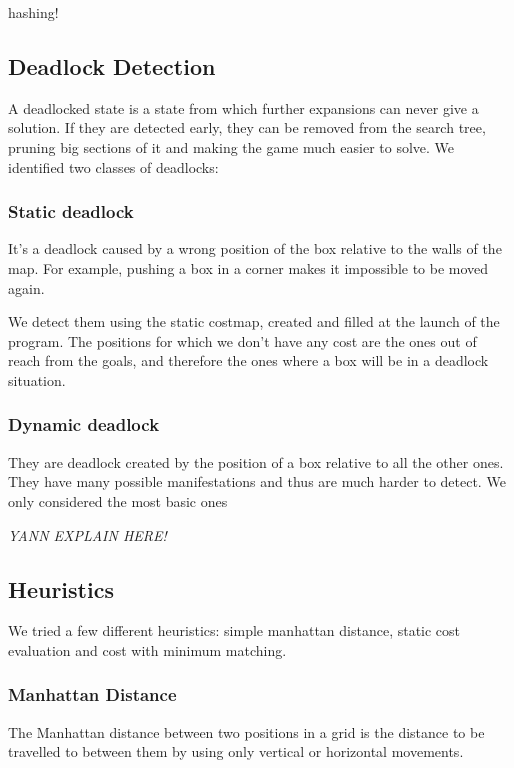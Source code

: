 \documentclass[a4paper,11pt]{article}
\begin{document}
hashing!

\subsection{Deadlock Detection}

A deadlocked state is a state from which further expansions can never give a
solution. If they are detected early, they can be removed from the search tree,
pruning big sections of it and making the game much easier to solve. We 
identified two classes of deadlocks:

\subsubsection{Static deadlock}

It's a deadlock caused by a wrong position of the box relative to the walls of
the map. For example, pushing a box in a corner makes it impossible to be moved
again. 

We detect them using the static costmap, created and filled at the launch of
the program. The positions for which we don't have any cost are the ones out
of reach from the goals, and therefore the ones where a box will be in a 
deadlock situation.

\subsubsection{Dynamic deadlock}

They are deadlock created by the position of a box relative to all the other
ones. They have many possible manifestations and thus are much harder to 
detect. We only considered the most basic ones

\emph{YANN EXPLAIN HERE!}


\subsection{Heuristics}

We tried a few different heuristics: simple manhattan distance, static cost
evaluation and cost with minimum matching.

\subsubsection{Manhattan Distance}

The Manhattan distance between two positions in a grid is the distance to be
travelled to between them by using only vertical or horizontal movements.
\end{document}
